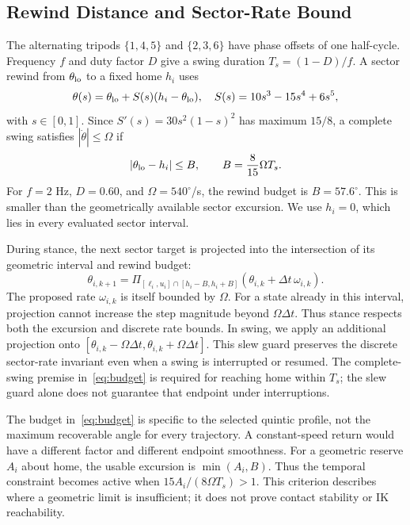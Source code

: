 \documentclass[letterpaper,10pt,conference]{ieeeconf}
\begin{document}
\subsection{Rewind Distance and Sector-Rate Bound}
The alternating tripods $\{1,4,5\}$ and $\{2,3,6\}$ have phase offsets of one half-cycle. Frequency $f$ and duty factor $D$ give a swing duration $T_s=(1-D)/f$. A sector rewind from $\theta_{\rm lo}$ to a fixed home $h_i$ uses
\begin{equation}
 \theta(s)=\theta_{\rm lo}+S(s)(h_i-\theta_{\rm lo}),\quad
 S(s)=10s^3-15s^4+6s^5,
\end{equation}
with $s\in[0,1]$. Since $S'(s)=30s^2(1-s)^2$ has maximum $15/8$, a complete swing satisfies $|\dot\theta|\le\Omega$ if
\begin{equation}
 |\theta_{\rm lo}-h_i|\le B,\qquad B=\frac{8}{15}\Omega T_s.\label{eq:budget}
\end{equation}
For $f=2$ Hz, $D=0.60$, and $\Omega=540^\circ$/s, the rewind budget is $B=57.6^\circ$. This is smaller than the geometrically available sector excursion. We use $h_i=0$, which lies in every evaluated sector interval.

During stance, the next sector target is projected into the intersection of its geometric interval and rewind budget:
\begin{equation}
 \theta_{i,k+1}=\Pi_{[\ell_i,u_i]\cap[h_i-B,h_i+B]}
     (\theta_{i,k}+\Delta t\,\omega_{i,k}).\label{eq:project}
\end{equation}
The proposed rate $\omega_{i,k}$ is itself bounded by $\Omega$. For a state already in this interval, projection cannot increase the step magnitude beyond $\Omega\Delta t$. Thus stance respects both the excursion and discrete rate bounds. In swing, we apply an additional projection onto $[\theta_{i,k}-\Omega\Delta t,\theta_{i,k}+\Omega\Delta t]$. This slew guard preserves the discrete sector-rate invariant even when a swing is interrupted or resumed. The complete-swing premise in~\eqref{eq:budget} is required for reaching home within $T_s$; the slew guard alone does not guarantee that endpoint under interruptions.

The budget in~\eqref{eq:budget} is specific to the selected quintic profile, not the maximum recoverable angle for every trajectory. A constant-speed return would have a different factor and different endpoint smoothness. For a geometric reserve $A_i$ about home, the usable excursion is $\min(A_i,B)$. Thus the temporal constraint becomes active when $15A_i/(8\Omega T_s)>1$. This criterion describes where a geometric limit is insufficient; it does not prove contact stability or IK reachability.
\end{document}
